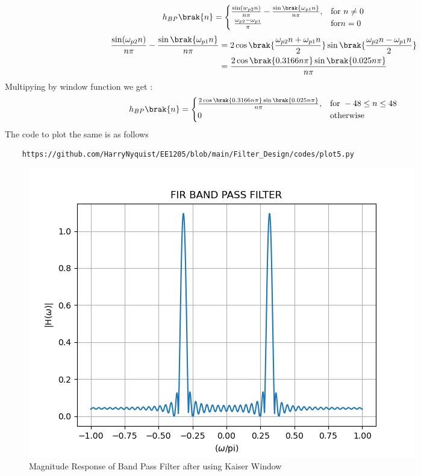 \documentclass{article}
\begin{document}
\begin{align}
    h_{BP}\brak{n} = 
\begin{cases} 
    \frac{\sin(w_{p2} n)}{n\pi} -\frac{\sin\brak{\omega_{p1}n}}{n\pi},  & \text{for } n\neq 0\\\
    \frac{\omega_{p2}-\omega_{p1}}{\pi} &\text{for} n= 0
\end{cases} \label{eq:h(n)desired_for_LPF_part_2}
\end{align}
\begin{align}
     \frac{\sin(\omega_{p2} n)}{n\pi} -\frac{\sin\brak{\omega_{p1}n}}{n\pi} &= 2\cos{\brak{\frac{\omega_{p2}n+\omega_{p1}n}{2}}}\sin{\brak{\frac{\omega_{p2}n-\omega_{p1}n}{2}}}\\
            &= \frac{2\cos{\brak{0.3166n\pi}}\sin{\brak{0.025n\pi}}}{n\pi}
\end{align}
Multipying by window function we get :
\begin{align}
    h_{BP}\brak{n} = 
\begin{cases} 
   \frac{2\cos{\brak{0.3166n\pi}}\sin{\brak{0.025n\pi}}}{n\pi},  & \text{for } -48\leq n \leq 48 \\
    0 &\text{otherwise}
\end{cases} \label{eq:h(n)desired_for_BPF}
\end{align}
The code to plot the same is as follows
\begin{lstlisting}
    https://github.com/HarryNyquist/EE1205/blob/main/Filter_Design/codes/plot5.py
\end{lstlisting}
\begin{figure}[H]
\centering
\includegraphics[width=1\columnwidth]{figs/FIR_Bandpass_Filter.png}
\caption{Magnitude Response of Band Pass Filter after using Kaiser Window}
\label{fig:Kaiser_BPF_response}
\end{figure}
\end{document}

